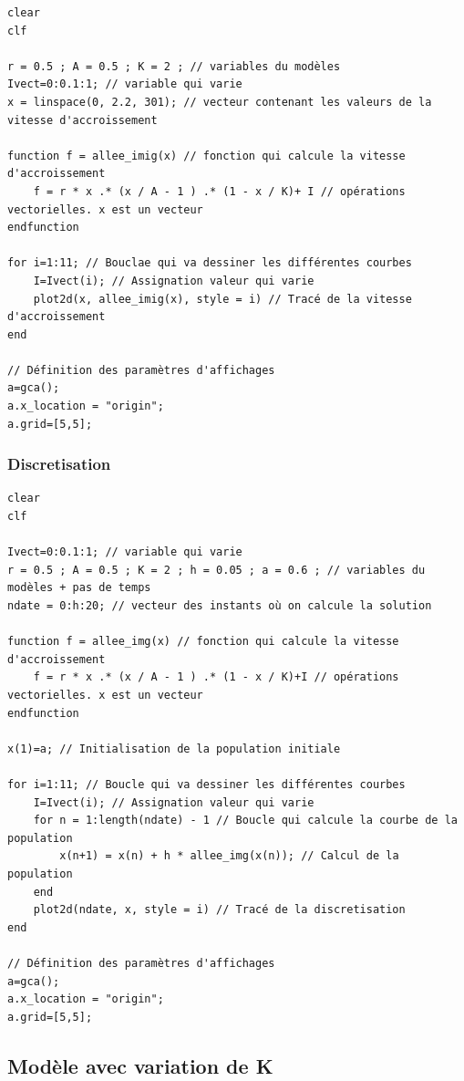 \documentclass{article}
\begin{document}
\begin{verbatim}
clear
clf

r = 0.5 ; A = 0.5 ; K = 2 ; // variables du modèles
Ivect=0:0.1:1; // variable qui varie
x = linspace(0, 2.2, 301); // vecteur contenant les valeurs de la vitesse d'accroissement

function f = allee_imig(x) // fonction qui calcule la vitesse d'accroissement
    f = r * x .* (x / A - 1 ) .* (1 - x / K)+ I // opérations vectorielles. x est un vecteur
endfunction

for i=1:11; // Bouclae qui va dessiner les différentes courbes
    I=Ivect(i); // Assignation valeur qui varie
    plot2d(x, allee_imig(x), style = i) // Tracé de la vitesse d'accroissement
end

// Définition des paramètres d'affichages
a=gca();
a.x_location = "origin";
a.grid=[5,5];
\end{verbatim}

\subsubsection{Discretisation}

\begin{verbatim}
clear
clf

Ivect=0:0.1:1; // variable qui varie
r = 0.5 ; A = 0.5 ; K = 2 ; h = 0.05 ; a = 0.6 ; // variables du modèles + pas de temps
ndate = 0:h:20; // vecteur des instants où on calcule la solution

function f = allee_img(x) // fonction qui calcule la vitesse d'accroissement
    f = r * x .* (x / A - 1 ) .* (1 - x / K)+I // opérations vectorielles. x est un vecteur
endfunction

x(1)=a; // Initialisation de la population initiale

for i=1:11; // Boucle qui va dessiner les différentes courbes
    I=Ivect(i); // Assignation valeur qui varie
    for n = 1:length(ndate) - 1 // Boucle qui calcule la courbe de la population
        x(n+1) = x(n) + h * allee_img(x(n)); // Calcul de la population
    end 
    plot2d(ndate, x, style = i) // Tracé de la discretisation
end

// Définition des paramètres d'affichages
a=gca();
a.x_location = "origin";
a.grid=[5,5];
\end{verbatim}

\subsection{Modèle avec variation de K}
\end{document}
